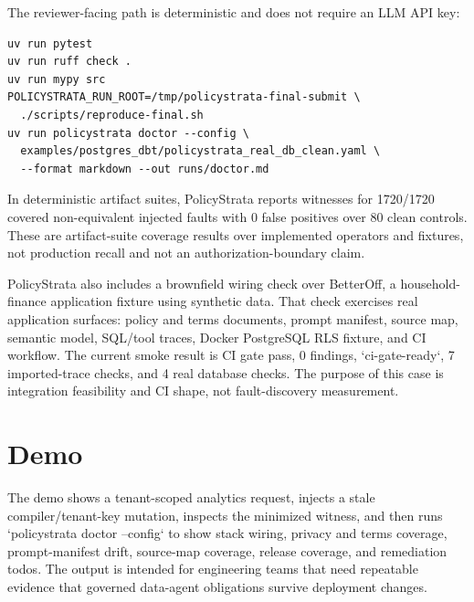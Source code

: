 \documentclass[10pt,conference]{IEEEtran}
\begin{document}
The reviewer-facing path is deterministic and does not require an LLM API key:

\begin{small}
\begin{verbatim}
uv run pytest
uv run ruff check .
uv run mypy src
POLICYSTRATA_RUN_ROOT=/tmp/policystrata-final-submit \
  ./scripts/reproduce-final.sh
uv run policystrata doctor --config \
  examples/postgres_dbt/policystrata_real_db_clean.yaml \
  --format markdown --out runs/doctor.md
\end{verbatim}
\end{small}

In deterministic artifact suites, PolicyStrata reports witnesses for 1720/1720 covered non-equivalent injected faults with 0 false positives over 80 clean controls. These are artifact-suite coverage results over implemented operators and fixtures, not production recall and not an authorization-boundary claim.

PolicyStrata also includes a brownfield wiring check over BetterOff, a household-finance application fixture using synthetic data. That check exercises real application surfaces: policy and terms documents, prompt manifest, source map, semantic model, SQL/tool traces, Docker PostgreSQL RLS fixture, and CI workflow. The current smoke result is CI gate pass, 0 findings, `ci-gate-ready`, 7 imported-trace checks, and 4 real database checks. The purpose of this case is integration feasibility and CI shape, not fault-discovery measurement.

\section{Demo}

The demo shows a tenant-scoped analytics request, injects a stale compiler/tenant-key mutation, inspects the minimized witness, and then runs `policystrata doctor --config` to show stack wiring, privacy and terms coverage, prompt-manifest drift, source-map coverage, release coverage, and remediation todos. The output is intended for engineering teams that need repeatable evidence that governed data-agent obligations survive deployment changes.
\end{document}
